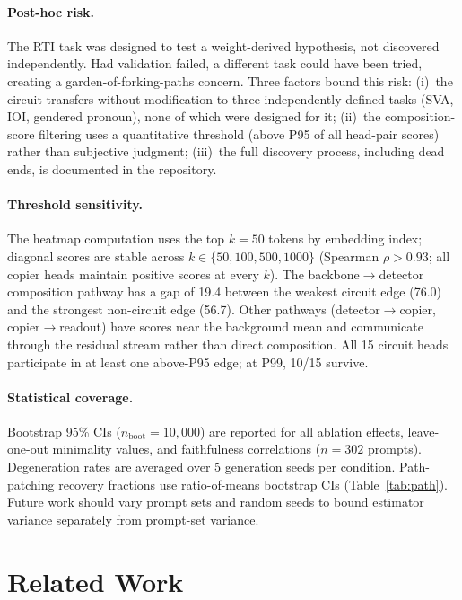 \documentclass{article}
\begin{document}
\paragraph{Post-hoc risk.}
The RTI task was designed to test a weight-derived hypothesis, not
discovered independently. Had validation failed, a different task
could have been tried, creating a garden-of-forking-paths concern.
Three factors bound this risk: (i)~the circuit transfers without
modification to three independently defined tasks (SVA, IOI, gendered
pronoun), none of which were designed for it; (ii)~the composition-score
filtering uses a quantitative threshold (above P95 of all head-pair
scores) rather than subjective judgment; (iii)~the full discovery
process, including dead ends, is documented in the repository.

\paragraph{Threshold sensitivity.}
The heatmap computation uses the top $k = 50$ tokens by embedding
index; diagonal scores are stable across $k \in \{50, 100, 500, 1000\}$
(Spearman $\rho > 0.93$; all copier heads maintain positive scores at
every $k$). The backbone$\to$detector composition pathway has a gap of
19.4 between the weakest circuit edge (76.0) and the strongest
non-circuit edge (56.7). Other pathways (detector$\to$copier,
copier$\to$readout) have scores near the background mean and
communicate through the residual stream rather than direct composition.
All 15 circuit heads participate in at least one above-P95 edge;
at P99, 10/15 survive.

\paragraph{Statistical coverage.}
Bootstrap 95\% CIs ($n_{\text{boot}} = 10{,}000$) are reported for all
ablation effects, leave-one-out minimality values, and faithfulness
correlations ($n = 302$ prompts). Degeneration rates are averaged over
5 generation seeds per condition. Path-patching recovery fractions use ratio-of-means bootstrap
CIs (Table~\ref{tab:path}). Future work should vary prompt
sets and random seeds to bound estimator variance separately from
prompt-set variance.


\section{Related Work}
\label{sec:related}
\end{document}
